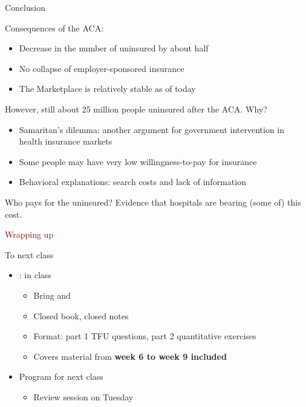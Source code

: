 \begin{frame}{Conclusion}

Consequences of the ACA:
\begin{itemize}
    \item Decrease in the number of uninsured by about half
    \item No collapse of employer-sponsored insurance
    \item The Marketplace is relatively stable as of today
\end{itemize}
\vspace{2mm}

However, still about 25 million people uninsured after the ACA. Why?
\begin{itemize}
    \item Samaritan's dilemma: another argument for government intervention in health insurance markets
    \item Some people may have very low willingness-to-pay for insurance
    \item Behavioral explanations: search costs and lack of information
\end{itemize}
\vspace{2mm}

Who pays for the uninsured? Evidence that hospitals are bearing (some of) this cost.

\end{frame}
\begin{frame}{}
    \begin{center}
    \Large \textcolor{maroon}{Wrapping up}
    \end{center}
\end{frame}
\begin{frame}{To next class}
\begin{itemize}
    \item {}:  in class
    \begin{itemize}
        \item Bring  and 
        \item Closed book, closed notes
        \item Format: part 1 TFU questions, part 2 quantitative exercises
        \item Covers material from \textbf{week 6 to week 9 included}
    \end{itemize}
    \vspace{5mm}

    \item Program for next class
    \begin{itemize}
        \item Review session on Tuesday
    \end{itemize}
\end{itemize}
\end{frame}


